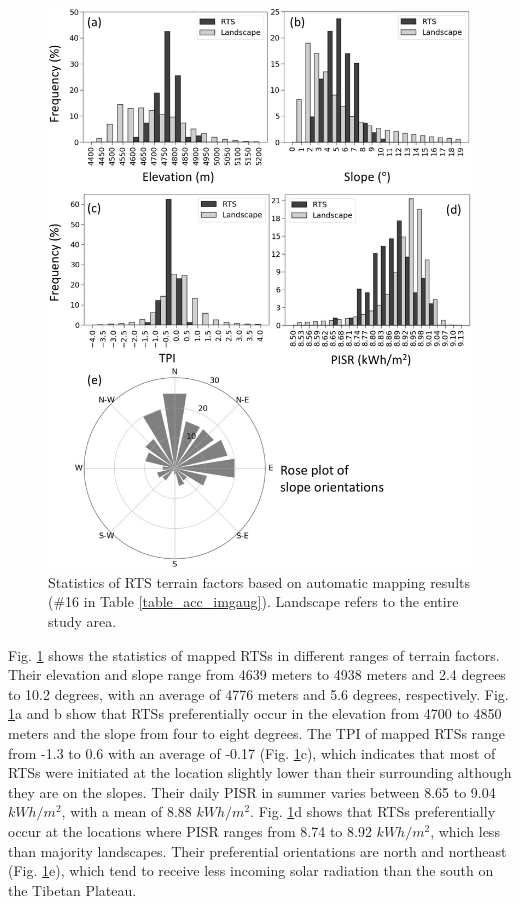 \documentclass[preprint,12pt,authoryear]{elsarticle}
\begin{document}
\begin{figure}
	\centering
	\includegraphics[width=13cm]{figures/terrain_var_fig_mapped_trim.jpg}
	\caption{Statistics of RTS terrain factors based on automatic mapping results  (\#16 in Table \ref{table_acc_imgaug}). Landscape refers to the entire study area.}
	\label{fig_terrain_factors}
\end{figure}

Fig. \ref{fig_terrain_factors} shows the statistics of mapped RTSs in different ranges of terrain factors. Their elevation and slope range from 4639 meters to 4938 meters and 2.4 degrees to 10.2 degrees, with an average of 4776 meters and 5.6 degrees, respectively. Fig. \ref{fig_terrain_factors}a and b show that RTSs preferentially occur in the elevation from 4700 to 4850 meters and the slope from four to eight degrees. The TPI of mapped RTSs range from -1.3 to 0.6 with an average of -0.17 (Fig. \ref{fig_terrain_factors}c), which indicates that most of RTSs were initiated at the location slightly lower than their surrounding although they are on the slopes. Their daily PISR in summer varies between 8.65 to 9.04 $kWh/m^2$, with a mean of 8.88 $kWh/m^2$. Fig. \ref{fig_terrain_factors}d shows that RTSs preferentially occur at the locations where PISR ranges from 8.74 to 8.92 $kWh/m^2$, which less than majority landscapes. Their preferential orientations are north and northeast (Fig. \ref{fig_terrain_factors}e), which tend to receive less incoming solar radiation than the south on the Tibetan Plateau. 
\end{document}

